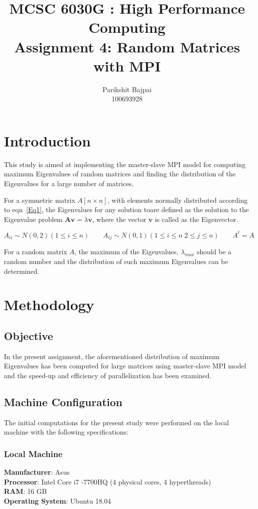 \documentclass[11pt, oneside]{article}
\title{MCSC 6030G : High Performance Computing \\ Assignment 4: Random Matrices with MPI}
\author{Parikshit Bajpai \\ 100693928}
\date{}							%
\begin{document}
\maketitle

\section{Introduction}
This study is aimed at implementing the master-slave MPI model for computing maximum Eigenvalues of random matrices and finding the distribution of the Eigenvalues for a large number of matrices.

For a symmetric matrix $A [ n \times n]$, with elements normally distributed according to eqn~\ref{Eq1}, the Eigenvalues for any solution toare defined as the solution to the Eigenvalue problem $\mathbf{A}\mathbf{v}=\lambda \mathbf{v}$, where the vector $\mathbf{v}$ is called as the Eigenvector.

\begin{equation} \label{Eq1}
A_{ii} \sim N(0,2)(1\leq i\leq n) \quad\text{}\quad
A_{ij} \sim N(0,1)(1\leq i\leq n \; 2\leq j\leq n) \quad\text{}\quad
A^{t}=A
\end{equation}

For a random matrix $A$, the maximum of the Eigenvalues, $\lambda _{max}$ should be a random number and the distribution of such maximum Eigenvalues can be determined. 

\section{Methodology}
   \subsection{Objective}
In the present assignment, the aforementioned distribution of maximum Eigenvalues has been computed for large matrices using master-slave MPI model and the speed-up and efficiency of parallelization has been examined.


\subsection{Machine Configuration}
The initial computations for the present study were performed on the local machine with the following specifications:
      \subsubsection{Local Machine}
        \textbf{Manufacturer}: Asus\\
	\textbf{Processor}: Intel Core i7 -7700HQ (4 physical cores, 4 hyperthreads)\\
	\textbf{RAM}:  16 GB\\
	\textbf{Operating System}: Ubuntu 18.04\\
\end{document}
